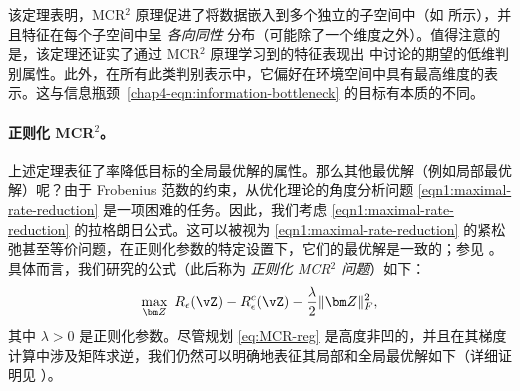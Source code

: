 \documentclass[../../book-main_zh.tex]{subfiles}
\begin{document}
该定理表明，MCR$^2$ 原理促进了将数据嵌入到多个独立的子空间中（如  所示），并且特征在每个子空间中呈 {\em 各向同性} 分布（可能除了一个维度之外）。值得注意的是，该定理还证实了通过 MCR$^2$ 原理学习到的特征表现出  中讨论的期望的低维判别属性。此外，在所有此类判别表示中，它偏好在环境空间中具有最高维度的表示。这与信息瓶颈~\eqref{chap4-eqn:information-bottleneck} 的目标有本质的不同。

\paragraph{正则化 MCR$^2$。}
上述定理表征了率降低目标的全局最优解的属性。那么其他最优解（例如局部最优解）呢？由于 Frobenius 范数的约束，从优化理论的角度分析问题 \eqref{eqn1:maximal-rate-reduction} 是一项困难的任务。因此，我们考虑 \eqref{eqn1:maximal-rate-reduction} 的拉格朗日公式。这可以被视为 \eqref{eqn1:maximal-rate-reduction} 的紧松弛甚至等价问题，在正则化参数的特定设置下，它们的最优解是一致的；参见 \cite[Proposition 3.2]{wang2024global}。具体而言，我们研究的公式（此后称为 \textit{正则化 MCR$^2$ 问题}）如下：
\begin{align}\label{eq:MCR-reg}
    \max_{\bm Z}\ R_{\epsilon}(\vZ) - R_{\epsilon}^c(\vZ) -
    \frac{\lambda}{2}\|\bm Z\|_F^2,
\end{align}
其中 $\lambda > 0$ 是正则化参数。尽管规划 \eqref{eq:MCR-reg} 是高度非凹的，并且在其梯度计算中涉及矩阵求逆，我们仍然可以明确地表征其局部和全局最优解如下（详细证明见 \cite[Theorem 3.1]{wang2024global}）。
\end{document}
